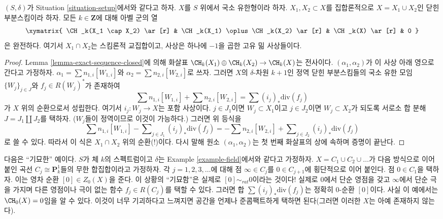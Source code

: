 \begin{lemma}
\label{lemma-exact-sequence-closed-chow}
$(S, \delta)$가 Situation \ref{situation-setup}에서와 같다고 하자.
$X$를 $S$ 위에서 국소 유한형이라 하자. $X_1, X_2 \subset X$를
집합론적으로 $X = X_1 \cup X_2$인 닫힌 부분스킴이라 하자. 모든
$k \in \mathbf{Z}$에 대해 아벨 군의 열
$$
\xymatrix{
\CH_k(X_1 \cap X_2) \ar[r] &
\CH_k(X_1) \oplus \CH_k(X_2) \ar[r] &
\CH_k(X) \ar[r] &
0
}
$$
은 완전하다. 여기서 $X_1 \cap X_2$는 스킴론적 교집합이고, 사상은
하나에 $-1$을 곱한 고유 밂 사상들이다.
\end{lemma}

\begin{proof}
Lemma \ref{lemma-exact-sequence-closed}에 의해 화살표
$\CH_k(X_1) \oplus \CH_k(X_2) \to \CH_k(X)$는 전사이다.
$(\alpha_1, \alpha_2)$가 이 사상 아래 영으로 간다고 가정하자.
$\alpha_1 = \sum n_{1, i}[W_{1, i}]$와
$\alpha_2 = \sum n_{2, i}[W_{2, i}]$로 쓰자. 그러면 $X$의
$\delta$-차원 $k + 1$인 정역 닫힌 부분스킴들의 국소 유한 모임
$\{W_j\}_{j \in J}$와 $f_j \in R(W_j)^*$가 존재하여
$$
\sum n_{1, i}[W_{1, i}] + \sum n_{2, i}[W_{2, i}] = \sum (i_j)_*\text{div}(f_j)
$$
가 $X$ 위의 순환으로서 성립한다. 여기서 $i_j : W_j \to X$는 포함
사상이다. $j \in J_1$이면 $W_j \subset X_1$이고 $j \in J_2$이면
$W_j \subset X_2$가 되도록 서로소 합 분해 $J = J_1 \amalg J_2$를
택하자. ($W_j$들이 정역이므로 이것이 가능하다.) 그러면 위 등식을
$$
\sum n_{1, i}[W_{1, i}] - \sum\nolimits_{j \in J_1} (i_j)_*\text{div}(f_j) =
- \sum n_{2, i}[W_{2, i}] + \sum\nolimits_{j \in J_2} (i_j)_*\text{div}(f_j)
$$
로 쓸 수 있다. 따라서 이 식은 $X_1 \cap X_2$ 위의 순환(!)이다.
다시 말해 원소 $(\alpha_1, \alpha_2)$는 첫 번째 화살표의 상에 속하며
증명이 끝난다.
\end{proof}

\begin{example}
\label{example-weird}
다음은 “기묘한” 예이다. $S$가 체 $k$의 스펙트럼이고 $\delta$는 Example
\ref{example-field}에서와 같다고 가정하자.
$X = C_1 \cup C_2 \cup \ldots$가 다음 방식으로 이어 붙인 곡선
$C_j \cong \mathbf{P}^1_k$들의 무한 합집합이라고 가정하자. 각
$j = 1, 2, 3, \ldots$에 대해 점 $\infty \in C_j$를
$0 \in C_{j + 1}$에 횡단적으로 이어 붙인다. 점 $0 \in C_1$을 택하자.
이는 영차 순환 $[0] \in Z_0(X)$을 준다. 이 상황의 “기묘함”은 실제로
$[0] \sim_{rat} 0$이라는 것이다! 실제로 $0$에서 단순 영점을 갖고
$\infty$에서 단순 극을 가지며 다른 영점이나 극이 없는 함수
$f_j \in R(C_j)$를 택할 수 있다. 그러면 합
$\sum (i_j)_*\text{div}(f_j)$는 정확히 $0$-순환 $[0]$이다. 사실 이
예에서는 $\CH_0(X) = 0$임을 알 수 있다. 이것이 너무 기괴하다고
느껴지면 공간을 언제나 준콤팩트하게 택하면 된다(그러면 이러한 $X$는
아예 존재하지 않는다).
\end{example}

